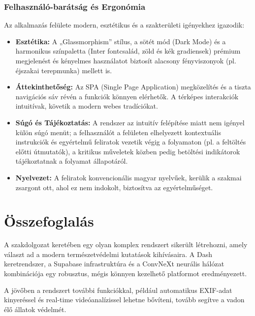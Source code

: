 \documentclass[
	parspace, %
]{elteikthesis}[2024/04/26]
\begin{document}
\subsection{Felhasználó-barátság és Ergonómia}
Az alkalmazás felülete modern, esztétikus és a szakterületi igényekhez igazodik:
\begin{itemize}
    \item \textbf{Esztétika:} A „Glassmorphism” stílus, a sötét mód (Dark Mode) és a harmonikus színpaletta (Inter fontcsalád, zöld és kék gradiensek) prémium megjelenést és kényelmes használatot biztosít alacsony fényviszonyok (pl. éjszakai terepmunka) mellett is.
    \item \textbf{Áttekinthetőség:} Az SPA (Single Page Application) megközelítés és a tiszta navigációs sáv révén a funkciók könnyen elérhetők. A térképes interakciók intuitívak, követik a modern webes tradíciókat.
    \item \textbf{Súgó és Tájékoztatás:} A rendszer az intuitív felépítése miatt nem igényel külön súgó menüt; a felhasználót a felületen elhelyezett kontextuális instrukciók és egyértelmű feliratok vezetik végig a folyamaton (pl. a feltöltés előtti útmutatók), a kritikus műveletek közben pedig betöltési indikátorok tájékoztatnak a folyamat állapotáról.
    \item \textbf{Nyelvezet:} A feliratok konvencionális magyar nyelvűek, kerülik a szakmai zsargont ott, ahol ez nem indokolt, biztosítva az egyértelműséget.
\end{itemize}

\chapter{Összefoglalás}
\label{ch:sum}

A szakdolgozat keretében egy olyan komplex rendszert sikerült létrehozni, amely választ ad a modern természetvédelmi kutatások kihívásaira. A Dash keretrendszer, a Supabase infrastruktúra és a ConvNeXt neurális hálózat kombinációja egy robusztus, mégis könnyen kezelhető platformot eredményezett.

A jövőben a rendszert további funkciókkal, például automatikus EXIF-adat kinyeréssel és real-time videóanalízissel lehetne bővíteni, tovább segítve a vadon élő állatok védelmét.

\printbibliography[title=\biblabel]
\end{document}

